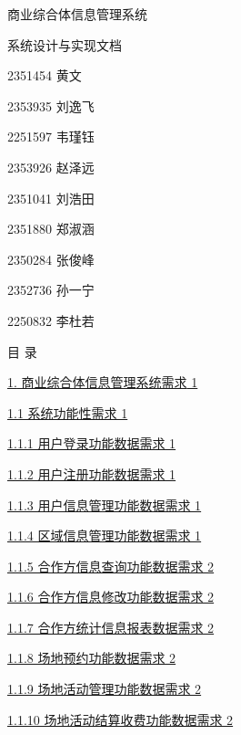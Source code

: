 \documentclass[]{article}
\date{}
\begin{document}
\protect\hypertarget{_Hlk208135206}{}{}商业综合体信息管理系统

系统设计与实现文档

2351454 黄文

2353935 刘逸飞

2251597 韦瑾钰

2353926 赵泽远

2351041 刘浩田

2351880 郑淑涵

2350284 张俊峰

2352736 孙一宁

2250832 李杜若

目 录

\protect\hyperlink{_Toc77076512}{{1.} 商业综合体信息管理{系统需求} 1}

\protect\hyperlink{ux7cfbux7edfux529fux80fdux6027ux9700ux6c42}{1.1
系统功能性需求 1}

\protect\hyperlink{ux7528ux6237ux767bux5f55ux529fux80fdux6570ux636eux9700ux6c42}{1.1.1
用户登录功能数据需求 1}

\protect\hyperlink{ux7528ux6237ux6ce8ux518cux529fux80fdux6570ux636eux9700ux6c42}{1.1.2
用户注册功能数据需求 1}

\protect\hyperlink{ux7528ux6237ux4fe1ux606fux7ba1ux7406ux529fux80fdux6570ux636eux9700ux6c42}{1.1.3
用户信息管理功能数据需求 1}

\protect\hyperlink{ux533aux57dfux4fe1ux606fux7ba1ux7406ux529fux80fdux6570ux636eux9700ux6c42}{1.1.4
区域信息管理功能数据需求 1}

\protect\hyperlink{ux5408ux4f5cux65b9ux4fe1ux606fux67e5ux8be2ux529fux80fdux6570ux636eux9700ux6c42}{1.1.5
合作方信息查询功能数据需求 2}

\protect\hyperlink{ux5408ux4f5cux65b9ux4fe1ux606fux4feeux6539ux529fux80fdux6570ux636eux9700ux6c42}{1.1.6
合作方信息修改功能数据需求 2}

\protect\hyperlink{ux5408ux4f5cux65b9ux7edfux8ba1ux4fe1ux606fux62a5ux8868ux6570ux636eux9700ux6c42}{1.1.7
合作方统计信息报表数据需求 2}

\protect\hyperlink{ux573aux5730ux9884ux7ea6ux529fux80fdux6570ux636eux9700ux6c42}{1.1.8
场地预约功能数据需求 2}

\protect\hyperlink{ux573aux5730ux6d3bux52a8ux7ba1ux7406ux529fux80fdux6570ux636eux9700ux6c42}{1.1.9
场地活动管理功能数据需求 2}

\protect\hyperlink{ux573aux5730ux6d3bux52a8ux7ed3ux7b97ux6536ux8d39ux529fux80fdux6570ux636eux9700ux6c42}{1.1.10
场地活动结算收费功能数据需求 2}
\end{document}

